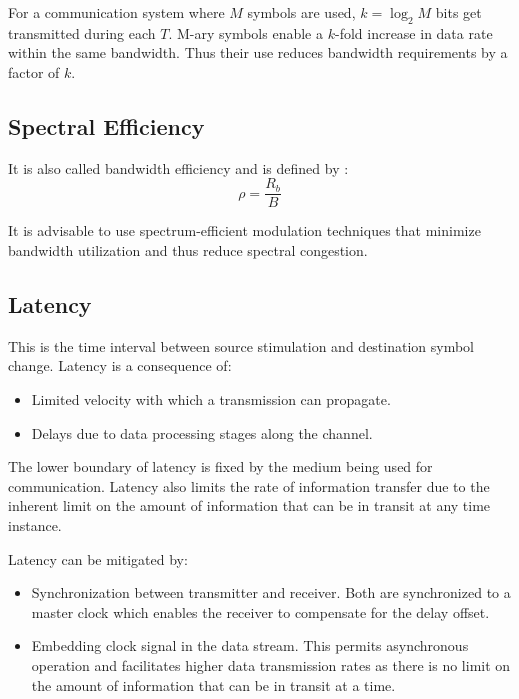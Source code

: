 For a communication system where \(M\) symbols are used, \(k = \log_2 M\) bits get transmitted during each \(T\). M-ary symbols enable a \(k\)-fold increase in data rate within the same bandwidth. Thus their use reduces bandwidth requirements by a factor of \(k\)\cite{AWGN}.

\subsection{Spectral Efficiency}
It is also called bandwidth efficiency and is defined by \cite{hayk}:
\[
	\rho = \frac{R_b}{B}
\]
\begin{mathDef}
\end{mathDef}
It is advisable to use spectrum-efficient modulation techniques that minimize bandwidth utilization and thus reduce spectral congestion\cite{AWGN}.

\subsection{Latency}
This is the time interval between source stimulation and destination symbol change. Latency is a consequence of:
\begin{itemize}
	\item Limited velocity with which a transmission can propagate.
	\item Delays due to data processing stages along the channel.
\end{itemize}
The lower boundary of latency is fixed by the medium being used for communication. Latency also limits the rate of information transfer due to the inherent limit on the amount of information that can be in transit at any time instance.

Latency can be mitigated by:
\begin{itemize}
	\item Synchronization between transmitter and receiver. Both are synchronized to a master clock which enables the receiver to compensate for the delay offset.
	\item Embedding clock signal in the data stream\cite{Proakis}. This permits asynchronous operation and facilitates higher data transmission rates as there is no limit on the amount of information that can be in transit at a time.
\end{itemize}
